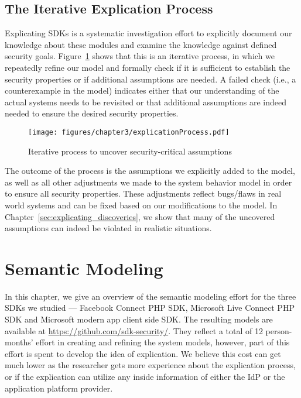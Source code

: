 \subsection{The Iterative Explication Process}

Explicating SDKs is a systematic investigation effort to explicitly document our knowledge about these modules and examine the knowledge against defined security goals.  Figure~\ref{fig:iterativeprocess} shows that this is an iterative process, in which we repeatedly refine our model and formally check if it is sufficient to establish the security properties or if additional assumptions are needed.  A failed check (i.e., a counterexample in the model) indicates either that our understanding of the actual systems needs to be revisited or that additional assumptions are indeed needed to ensure the desired security properties.  

\begin{figure}[hbt]
\centering
\texttt{[image: figures/chapter3/explicationProcess.pdf]}
\caption{Iterative process to uncover security-critical assumptions}
\label{fig:iterativeprocess}
\end{figure}

The outcome of the process is the assumptions we explicitly added to the model, as well as all other adjustments we made to the system behavior model in order to ensure all security properties.  These adjustments reflect bugs/flaws in real world systems and can be fixed based on our modifications to the model.  In Chapter~\ref{sec:explicating_discoveries}, we show that many of the uncovered assumptions can indeed be violated in realistic situations. 

\section{Semantic Modeling}
\label{sec:explicating_semantic_modeling}
In this chapter, we give an overview of the semantic modeling effort for the three SDKs we studied --- Facebook Connect PHP SDK, Microsoft Live Connect PHP SDK and Microsoft modern app client side SDK.  The resulting models are available at \url{https://github.com/sdk-security/}. They reflect a total of 12 person-months' effort in creating and refining the system models, however, part of this effort is spent to develop the idea of explication.  We believe this cost can get much lower as the researcher gets more experience about the explication process, or if the explication can utilize any inside information of either the IdP or the application platform provider.

